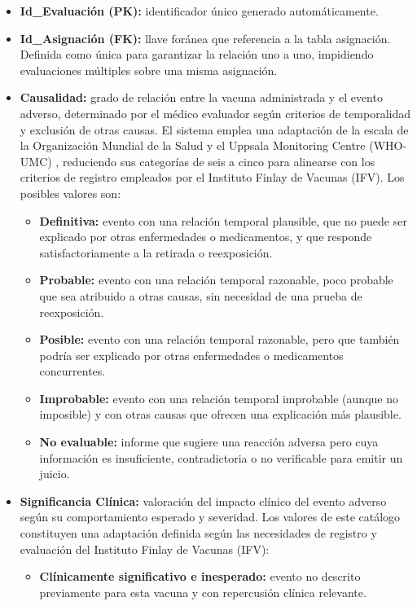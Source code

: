 \begin{itemize}
    \item \textbf{Id\_Evaluación (PK):} identificador único generado automáticamente.
    \item \textbf{Id\_Asignación (FK):} llave foránea que referencia a la tabla asignación. Definida como única para garantizar la relación uno a uno, impidiendo evaluaciones múltiples sobre una misma asignación.
    \item \textbf{Causalidad:} grado de relación entre la vacuna administrada y el evento adverso, determinado por el médico evaluador según criterios de temporalidad y exclusión de otras causas. El sistema emplea una adaptación de la escala de la Organización Mundial de la Salud y el Uppsala Monitoring Centre (WHO-UMC) \cite{who-umc-causality}, reduciendo sus categorías de seis a cinco para alinearse con los criterios de registro empleados por el Instituto Finlay de Vacunas (IFV). Los posibles valores son:
    \begin{itemize}
        \item \textbf{Definitiva:} evento con una relación temporal plausible, que no puede ser explicado por otras enfermedades o medicamentos, y que responde satisfactoriamente a la retirada o reexposición.
        \item \textbf{Probable:} evento con una relación temporal razonable, poco probable que sea atribuido a otras causas, sin necesidad de una prueba de reexposición.
        \item \textbf{Posible:} evento con una relación temporal razonable, pero que también podría ser explicado por otras enfermedades o medicamentos concurrentes.
        \item \textbf{Improbable:} evento con una relación temporal improbable (aunque no imposible) y con otras causas que ofrecen una explicación más plausible.
        \item \textbf{No evaluable:} informe que sugiere una reacción adversa pero cuya información es insuficiente, contradictoria o no verificable para emitir un juicio.
    \end{itemize}
    \item \textbf{Significancia Clínica:} valoración del impacto clínico del evento adverso según su comportamiento esperado y severidad. Los valores de este catálogo constituyen una adaptación definida según las necesidades de registro y evaluación del Instituto Finlay de Vacunas (IFV):
    \begin{itemize}
        \item \textbf{Clínicamente significativo e inesperado:} evento no descrito previamente para esta vacuna y con repercusión clínica relevante.

\end{itemize}
\end{itemize}
